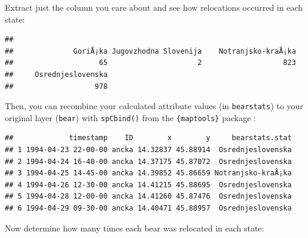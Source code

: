\documentclass[]{book}
\newenvironment{Shaded}{\begin{snugshade}}{\end{snugshade}}
\newcommand{\KeywordTok}[1]{\textcolor[rgb]{0.13,0.29,0.53}{\textbf{#1}}}
\newcommand{\DataTypeTok}[1]{\textcolor[rgb]{0.13,0.29,0.53}{#1}}
\newcommand{\DecValTok}[1]{\textcolor[rgb]{0.00,0.00,0.81}{#1}}
\newcommand{\StringTok}[1]{\textcolor[rgb]{0.31,0.60,0.02}{#1}}
\newcommand{\OperatorTok}[1]{\textcolor[rgb]{0.81,0.36,0.00}{\textbf{#1}}}
\newcommand{\NormalTok}[1]{#1}
\theoremstyle{definition}
\theoremstyle{definition}
\theoremstyle{definition}
\theoremstyle{remark}
\begin{document}
Extract just the column you care about and see how relocations occurred
in each state:

\begin{Shaded}
\end{Shaded}

\begin{verbatim}
## 
##              GoriÅ¡ka Jugovzhodna Slovenija    Notranjsko-kraÅ¡ka 
##                    65                     2                   823 
##     Osrednjeslovenska 
##                   978
\end{verbatim}

Then, you can recombine your calculated attribute values (in
\texttt{bearstats}) to your original layer (\texttt{bear}) with
\texttt{spCbind()} from the \texttt{\{maptools\}} package
\citep{R-maptools}:

\begin{Shaded}
\end{Shaded}

\begin{verbatim}
##             timestamp    ID        x        y     bearstats.stat
## 1 1994-04-23 22-00-00 ancka 14.32837 45.88914  Osrednjeslovenska
## 2 1994-04-24 16-40-00 ancka 14.37175 45.87072  Osrednjeslovenska
## 3 1994-04-25 14-45-00 ancka 14.39852 45.86659 Notranjsko-kraÅ¡ka
## 4 1994-04-26 12-30-00 ancka 14.41215 45.88695  Osrednjeslovenska
## 5 1994-04-28 12-00-00 ancka 14.41260 45.87476  Osrednjeslovenska
## 6 1994-04-29 09-30-00 ancka 14.40471 45.88957  Osrednjeslovenska
\end{verbatim}

Now determine how many times each bear was relocated in each state:

\begin{Shaded}
\end{Shaded}
\end{document}
